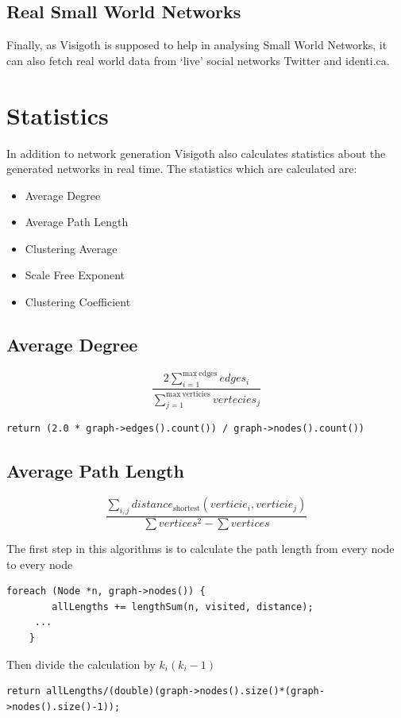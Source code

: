 \documentclass[a4paper,11pt,titlepage]{article}
\let\stdsection\section         %
\renewcommand{\section}{\newpage\stdsection}
\begin{document}
\subsection{Real Small World Networks}
Finally, as Visigoth is supposed to help in analysing Small World
Networks, it can also fetch real world data from `live' social
networks Twitter and identi.ca.


\section{Statistics}


In addition to network generation Visigoth also calculates statistics about the
generated networks in real time. The statistics which are calculated are:


\begin{itemize}
	\item Average Degree
	\item Average Path Length
	\item Clustering Average
	\item Scale Free Exponent
	\item Clustering Coefficient
\end{itemize}

\subsection{Average Degree}
\[
\frac{2\sum_{i=1}^{\mathrm{max\ edges}} edges_i}{\sum_{j=1}^{\mathrm{max\
verticies}} vertecies_j}
\]

\begin{lstlisting}
return (2.0 * graph->edges().count()) / graph->nodes().count())
\end{lstlisting}

\subsection{Average Path Length}
\[
\frac{\sum_{i,j}distance_\mathrm{shortest}(verticie_i,verticie_j)}{\sum
vertices^2 - \sum vertices}
\]

The first step in this algorithms is to calculate the path length from every
node to every node

\begin{lstlisting}
foreach (Node *n, graph->nodes()) {
        allLengths += lengthSum(n, visited, distance);
	 ...
    }
\end{lstlisting}
Then divide the calculation by $k_i(k_i-1)$
\begin{lstlisting}
return allLengths/(double)(graph->nodes().size()*(graph->nodes().size()-1));
\end{lstlisting}
\end{document}
